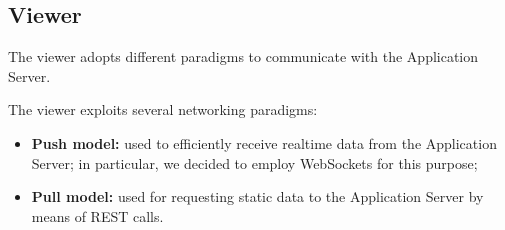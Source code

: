 \subsection{Viewer}
The viewer adopts different paradigms to communicate with the Application
Server.

The viewer exploits several networking paradigms:

\begin{itemize}
  \item \textbf{Push model:} used to efficiently receive realtime data from
    the Application Server; in particular, we decided to employ WebSockets
    for this purpose;
  \item \textbf{Pull model:} used for requesting static data to the
    Application Server by means of REST calls.
\end{itemize}
